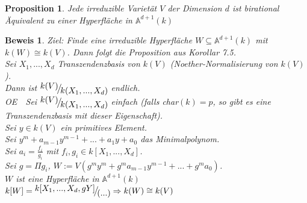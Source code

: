 \documentclass[a4paper,12pt]{report}
\theoremstyle{break}
\newtheorem{Prop}[Def]{Proposition}
\theoremstyle{nonumberbreak}
\theoremstyle{nonumberplain}
\newtheorem{Bew}{Beweis}
\newcommand{\FakRaum}[2]{
  \raisebox{0.7ex}{\ensuremath{#1}}
  \ensuremath{\mkern-3mu}\big/\ensuremath{\mkern-3mu}
  \raisebox{-0.6ex}{\ensuremath{#2}}}
\renewcommand{\OE}{O\!\!E}
\begin{document}
\begin{Prop}
\label{prop:17.2}
Jede irreduzible Varietät $V$ der Dimension $d$ ist birational Äquivalent zu einer Hyperfläche in $\mathbb{A}^{d+1}(k)$
\end{Prop}
\begin{Bew}
Ziel: Finde eine irreduzible Hyperfläche $W\subseteq\mathbb{A}^{d+1}(k)$ mit $k(W)\cong k(V)$. Dann folgt die Proposition aus Korollar 7.5.\\
Sei $X_1,...,X_d$ Transzendenzbasis von $k(V)$ (Noether-Normalisierung von $k(V)$).\\
Dann ist $\FakRaum{k(V)}{k(X_1,...,X_d)}$ endlich.\\
\OE~~Sei $\FakRaum{k(V)}{k(X_1,...,X_d)}$ einfach (falls char$(k)=p$, so gibt es eine Transzendenzbasis mit dieser Eigenschaft).\\
Sei $y\in k(V)$ ein primitives Element.\\
Sei $y^m+a_{m-1}y^{m-1}+...+a_1y+a_0$ das Minimalpolynom.\\
Sei $a_i=\frac{f_i}{g_i}$ mit $f_i, g_i\in k[X_1,...,X_d]$.\\
Sei $g=\Pi g_i$, $W:=V(g^my^m+g^ma_{m-1}y^{m-1}+...+g^ma_0)$.\\
$W$ ist eine Hyperfläche in $\mathbb{A}^{d+1}(k)$\\
$k[W]=\FakRaum{k[X_1,...,X_d,gY]}{(...)}\Rightarrow k(W)\cong k(V)$
\end{Bew}

\appendix

\def\indexspace{\par\medskip}
\end{document}
